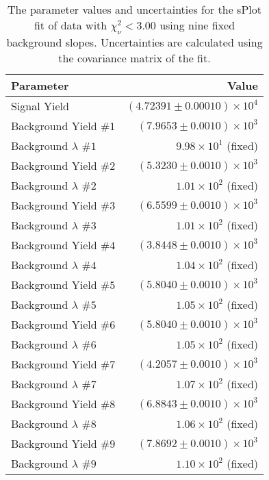 
\begin{table}[ht]
    \begin{center}
        \begin{tabular}{lr}\toprule
            Parameter & Value \\\midrule
            Signal Yield & $(4.72391 \pm 0.00010) \times 10^{4}$ \\
            Background Yield $\#1$ & $(7.9653 \pm 0.0010) \times 10^{3}$ \\
            Background $\lambda$ $\#1$ & $9.98 \times 10^{1}$ (fixed) \\
            Background Yield $\#2$ & $(5.3230 \pm 0.0010) \times 10^{3}$ \\
            Background $\lambda$ $\#2$ & $1.01 \times 10^{2}$ (fixed) \\
            Background Yield $\#3$ & $(6.5599 \pm 0.0010) \times 10^{3}$ \\
            Background $\lambda$ $\#3$ & $1.01 \times 10^{2}$ (fixed) \\
            Background Yield $\#4$ & $(3.8448 \pm 0.0010) \times 10^{3}$ \\
            Background $\lambda$ $\#4$ & $1.04 \times 10^{2}$ (fixed) \\
            Background Yield $\#5$ & $(5.8040 \pm 0.0010) \times 10^{3}$ \\
            Background $\lambda$ $\#5$ & $1.05 \times 10^{2}$ (fixed) \\
            Background Yield $\#6$ & $(5.8040 \pm 0.0010) \times 10^{3}$ \\
            Background $\lambda$ $\#6$ & $1.05 \times 10^{2}$ (fixed) \\
            Background Yield $\#7$ & $(4.2057 \pm 0.0010) \times 10^{3}$ \\
            Background $\lambda$ $\#7$ & $1.07 \times 10^{2}$ (fixed) \\
            Background Yield $\#8$ & $(6.8843 \pm 0.0010) \times 10^{3}$ \\
            Background $\lambda$ $\#8$ & $1.06 \times 10^{2}$ (fixed) \\
            Background Yield $\#9$ & $(7.8692 \pm 0.0010) \times 10^{3}$ \\
            Background $\lambda$ $\#9$ & $1.10 \times 10^{2}$ (fixed) \\\bottomrule
        \end{tabular}
        \caption{The parameter values and uncertainties for the sPlot fit of data with $\chi^2_\nu < 3.00$ using nine fixed background slopes. Uncertainties are calculated using the covariance matrix of the fit.}\label{tab:splot-fit-results-chisqdof-3.00-fixed-9}
    \end{center}
\end{table}
